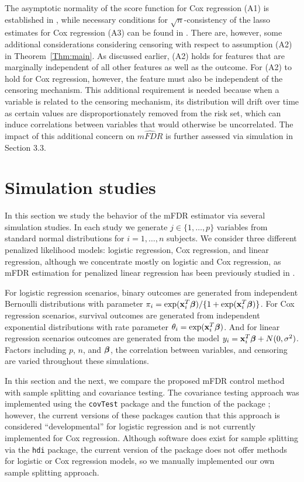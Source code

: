 The asymptotic normality of the score function for Cox regression (A1) is established in \citet{Andersen1982}, while necessary conditions for $\sqrt{n}$-consistency of the lasso estimates for Cox regression (A3) can be found in \citet{Fan_scad}.  There are, however, some additional considerations considering censoring with respect to assumption (A2) in Theorem~\ref{Thm:main}.  As discussed earlier, (A2) holds for features that are marginally independent of all other features as well as the outcome.  For (A2) to hold for Cox regression, however, the feature must also be independent of the censoring mechanism.  This additional requirement is needed because when a variable is related to the censoring mechanism, its distribution will drift over time as certain values are disproportionately removed from the risk set, which can induce correlations between variables that would otherwise be uncorrelated. The impact of this additional concern on $\widehat{mFDR}$ is further assessed via simulation in Section 3.3. 

\section{Simulation studies}

In this section we study the behavior of the mFDR estimator via several simulation studies. In each study we generate $j \in \{1, \ldots, p\}$ variables from standard normal distributions for $i = 1, \ldots, n$ subjects. We consider three different penalized likelihood models: logistic regression, Cox regression, and linear regression, although we concentrate mostly on logistic and Cox regression, as mFDR estimation for penalized linear regression has been previously studied in \citet{Breheny2017}.

For logistic regression scenarios, binary outcomes are generated from independent Bernoulli distributions with parameter $\pi_i = \exp(\mathbf{x}_i^T \boldsymbol{\beta})/\{1 + \exp(\mathbf{x}_i^T \boldsymbol{\beta})\}$. For Cox regression scenarios, survival outcomes are generated from independent exponential distributions with rate parameter $\theta_i = \exp(\mathbf{x}_i^T \boldsymbol{\beta})$. And for linear regression scenarios outcomes are generated from the model $y_i = \mathbf{x}_i^T\boldsymbol{\beta} + N(0,\sigma^2)$. Factors including $p$, $n$, and $\boldsymbol{\beta}$, the correlation between variables, and censoring are varied throughout these simulations.

In this section and the next, we compare the proposed mFDR control method with sample splitting and covariance testing.  The covariance testing approach was implemented using the {\tt covTest} package \citep{CovTest} and the  function of the  package \citep{Selective_Inference}; however, the current versions of these packages caution that this approach is considered ``developmental'' for logistic regression and is not currently implemented for Cox regression.  Although software does exist for sample splitting via the {\tt hdi} package, the current version of the package does not offer methods for logistic or Cox regression models, so we manually implemented our own sample splitting approach.

